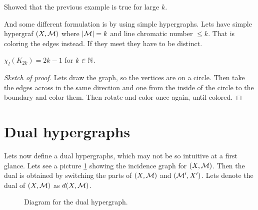 \begin{thm}
	Showed that the previous example is true for large $k$.
\end{thm}

And some different formulation is by using simple hypergraphs. Lets have simple hypergraf $(X,\mathcal{M})$ where $|\mathcal{M}| = k$ and line chromatic number $\leq k$. That is coloring the edges instead. If they meet they have to be distinct.

\begin{prop}
	$\chi_l (K_{2k}) = 2k-1$ for $k \in \mathbb{N}$.
\end{prop}

\begin{proof}[Sketch of proof]
	Lets draw the graph, so the vertices are on a circle. Then take the edges across in the same direction and one from the inside of the circle to the boundary and color them. Then rotate and color once again, until colored.
\end{proof}

\section{Dual hypergraphs}

Lets now define a dual hypergraphs, which may not be so intuitive at a first glance. Lets see a picture \ref{dual-hg} showing the incidence graph for $(X,\mathcal{M})$. Then the dual is obtained by switching the parts of $(X, \mathcal{M})$ and $(\mathcal{M}',X')$. Lets denote the dual of $(X,\mathcal{M})$ as $d(X,\mathcal{M})$.

\begin{figure}[!ht]\centering
	\begin{subfigure}{.45\textwidth}
	\end{subfigure}
	\begin{subfigure}{.45\textwidth}
	\end{subfigure}
	\caption{Diagram for the dual hypergraph.}
	\label{dual-hg}
\end{figure}


